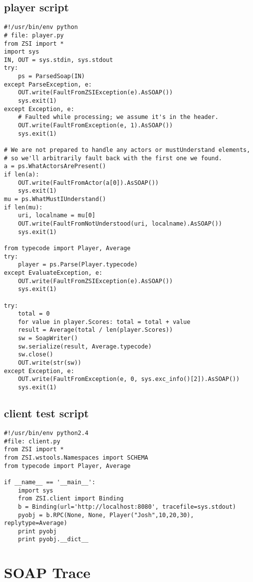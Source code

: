 \subsection{player script}
\begin{verbatim}
#!/usr/bin/env python
# file: player.py
from ZSI import *
import sys
IN, OUT = sys.stdin, sys.stdout
try:
    ps = ParsedSoap(IN)
except ParseException, e:
    OUT.write(FaultFromZSIException(e).AsSOAP())
    sys.exit(1)
except Exception, e:
    # Faulted while processing; we assume it's in the header.
    OUT.write(FaultFromException(e, 1).AsSOAP())
    sys.exit(1)

# We are not prepared to handle any actors or mustUnderstand elements,
# so we'll arbitrarily fault back with the first one we found.
a = ps.WhatActorsArePresent()
if len(a):
    OUT.write(FaultFromActor(a[0]).AsSOAP())
    sys.exit(1)
mu = ps.WhatMustIUnderstand()
if len(mu):
    uri, localname = mu[0]
    OUT.write(FaultFromNotUnderstood(uri, localname).AsSOAP())
    sys.exit(1)

from typecode import Player, Average
try:
    player = ps.Parse(Player.typecode)
except EvaluateException, e:
    OUT.write(FaultFromZSIException(e).AsSOAP())
    sys.exit(1)

try:
    total = 0
    for value in player.Scores: total = total + value
    result = Average(total / len(player.Scores))
    sw = SoapWriter()
    sw.serialize(result, Average.typecode)
    sw.close()
    OUT.write(str(sw))
except Exception, e:
    OUT.write(FaultFromException(e, 0, sys.exc_info()[2]).AsSOAP())
    sys.exit(1)
\end{verbatim}

\subsection{client test script}
\begin{verbatim}
#!/usr/bin/env python2.4
#file: client.py
from ZSI import *
from ZSI.wstools.Namespaces import SCHEMA
from typecode import Player, Average

if __name__ == '__main__':
    import sys
    from ZSI.client import Binding
    b = Binding(url='http://localhost:8080', tracefile=sys.stdout)
    pyobj = b.RPC(None, None, Player("Josh",10,20,30), replytype=Average)
    print pyobj
    print pyobj.__dict__
\end{verbatim}

\section{SOAP Trace}

